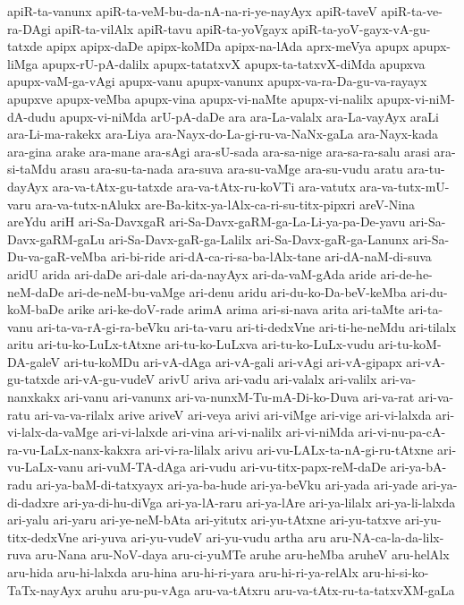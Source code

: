{apiR-ta-vanunx
apiR-ta-veM-bu-da-nA-na-ri-ye-nayAyx
apiR-taveV
apiR-ta-ve-ra-DAgi
apiR-ta-vilAlx
apiR-tavu
apiR-ta-yoVgayx
apiR-ta-yoV-gayx-vA-gu-tatxde
apipx
apipx-daDe
apipx-koMDa
apipx-na-lAda
aprx-meVya
apupx
apupx-liMga
apupx-rU-pA-dalilx
apupx-tatatxvX
apupx-ta-tatxvX-diMda
apupxva
apupx-vaM-ga-vAgi
apupx-vanu
apupx-vanunx
apupx-va-ra-Da-gu-va-rayayx
apupxve
apupx-veMba
apupx-vina
apupx-vi-naMte
apupx-vi-nalilx
apupx-vi-niM-dA-dudu
apupx-vi-niMda
arU-pA-daDe
ara
ara-La-valalx
ara-La-vayAyx
araLi
ara-Li-ma-rakekx
ara-Liya
ara-Nayx-do-La-gi-ru-va-NaNx-gaLa
ara-Nayx-kada
ara-gina
arake
ara-mane
ara-sAgi
ara-sU-sada
ara-sa-nige
ara-sa-ra-salu
arasi
ara-si-taMdu
arasu
ara-su-ta-nada
ara-suva
ara-su-vaMge
ara-su-vudu
aratu
ara-tu-dayAyx
ara-va-tAtx-gu-tatxde
ara-va-tAtx-ru-koVTi
ara-vatutx
ara-va-tutx-mU-varu
ara-va-tutx-nAlukx
are-Ba-kitx-ya-lAlx-ca-ri-su-titx-pipxri
areV-Nina
areYdu
ariH
ari-Sa-DavxgaR
ari-Sa-Davx-gaRM-ga-La-Li-ya-pa-De-yavu
ari-Sa-Davx-gaRM-gaLu
ari-Sa-Davx-gaR-ga-Lalilx
ari-Sa-Davx-gaR-ga-Lanunx
ari-Sa-Du-va-gaR-veMba
ari-bi-ride
ari-dA-ca-ri-sa-ba-lAlx-tane
ari-dA-naM-di-suva
aridU
arida
ari-daDe
ari-dale
ari-da-nayAyx
ari-da-vaM-gAda
aride
ari-de-he-neM-daDe
ari-de-neM-bu-vaMge
ari-denu
aridu
ari-du-ko-Da-beV-keMba
ari-du-koM-baDe
arike
ari-ke-doV-rade
arimA
arima
ari-si-nava
arita
ari-taMte
ari-ta-vanu
ari-ta-va-rA-gi-ra-beVku
ari-ta-varu
ari-ti-dedxVne
ari-ti-he-neMdu
ari-tilalx
aritu
ari-tu-ko-LuLx-tAtxne
ari-tu-ko-LuLxva
ari-tu-ko-LuLx-vudu
ari-tu-koM-DA-galeV
ari-tu-koMDu
ari-vA-dAga
ari-vA-gali
ari-vAgi
ari-vA-gipapx
ari-vA-gu-tatxde
ari-vA-gu-vudeV
arivU
ariva
ari-vadu
ari-valalx
ari-valilx
ari-va-nanxkakx
ari-vanu
ari-vanunx
ari-va-nunxM-Tu-mA-Di-ko-Duva
ari-va-rat
ari-va-ratu
ari-va-va-rilalx
arive
ariveV
ari-veya
arivi
ari-viMge
ari-vige
ari-vi-lalxda
ari-vi-lalx-da-vaMge
ari-vi-lalxde
ari-vina
ari-vi-nalilx
ari-vi-niMda
ari-vi-nu-pa-cA-ra-vu-LaLx-nanx-kakxra
ari-vi-ra-lilalx
arivu
ari-vu-LALx-ta-nA-gi-ru-tAtxne
ari-vu-LaLx-vanu
ari-vuM-TA-dAga
ari-vudu
ari-vu-titx-papx-reM-daDe
ari-ya-bA-radu
ari-ya-baM-di-tatxyayx
ari-ya-ba-hude
ari-ya-beVku
ari-yada
ari-yade
ari-ya-di-dadxre
ari-ya-di-hu-diVga
ari-ya-lA-raru
ari-ya-lAre
ari-ya-lilalx
ari-ya-li-lalxda
ari-yalu
ari-yaru
ari-ye-neM-bAta
ari-yitutx
ari-yu-tAtxne
ari-yu-tatxve
ari-yu-titx-dedxVne
ari-yuva
ari-yu-vudeV
ari-yu-vudu
artha
aru
aru-NA-ca-la-da-lilx-ruva
aru-Nana
aru-NoV-daya
aru-ci-yuMTe
aruhe
aru-heMba
aruheV
aru-helAlx
aru-hida
aru-hi-lalxda
aru-hina
aru-hi-ri-yara
aru-hi-ri-ya-relAlx
aru-hi-si-ko-TaTx-nayAyx
aruhu
aru-pu-vAga
aru-va-tAtxru
aru-va-tAtx-ru-ta-tatxvXM-gaLa
}
